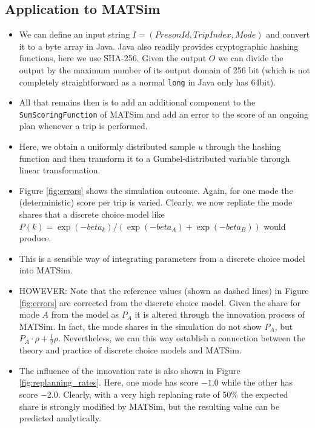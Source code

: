 \documentclass[a4paper]{article}
\begin{document}
\subsection{Application to MATSim}

\begin{itemize}
  \item We can define an input string $I = (Preson Id, Trip Index, Mode)$
  and convert it to a byte array in Java. Java also readily provides cryptographic
  hashing functions, here we use SHA-256. Given the output $O$ we can divide
  the output by the maximum number of its output domain of 256 bit (which is not
  completely straightforward as a normal \texttt{long} in Java only has 64bit).
  \item All that remains then is to add an additional component to the
  \texttt{SumScoringFunction} of MATSim and add an error to the score of an
  ongoing plan whenever a trip is performed.
  \item Here, we obtain a uniformly distributed sample $u$ through the hashing
  function and then transform it to a Gumbel-distributed variable through
  linear transformation.
  \item Figure \ref{fig:errors} shows the simulation outcome. Again, for one
  mode the (deterministic) score per trip is varied. Clearly, we now repliate
  the mode shares that a discrete choice model like $P(k) = \exp(-beta_k) / \left( \exp(-beta_A) + \exp(-beta_B) \right)$ would produce.
  \item This is a sensible way of integrating parameters from a discrete choice
  model into MATSim.
  \item HOWEVER: Note that the reference values (shown as dashed lines) in
  Figure \ref{fig:errors} are corrected from the discrete choice model. Given
  the share for mode $A$ from the model as $P_A$ it is altered through the
  innovation process of MATSim. In fact, the mode shares in the simulation do
  not show $P_A$, but $P_A \cdot \rho + \frac{1}{2} \rho$. Nevertheless, we
  can this way establish a connection between the theory and practice of
  discrete choice models and MATSim.
  \item The influence of the innovation rate is also shown in Figure \ref{fig:replanning_rates}.
  Here, one mode has score $-1.0$ while the other has score $-2.0$. Clearly,
  with a very high replaning rate of 50\% the expected share is strongly
  modified by MATSim, but the resulting value can be predicted analytically.
\end{itemize}
\end{document}
